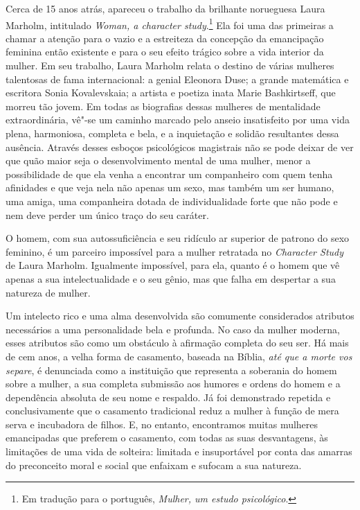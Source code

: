 Cerca de 15 anos atrás, apareceu o trabalho da brilhante norueguesa
Laura Marholm, intitulado \textit{Woman, a character study}.\footnote{Em tradução para o português, \textit{Mulher, um estudo psicológico}.} Ela foi uma das primeiras a
chamar a atenção para o vazio e a estreiteza da concepção da emancipação
feminina então existente e para o seu efeito trágico sobre a vida
interior da mulher. Em seu trabalho, Laura Marholm relata o destino de
várias mulheres talentosas de fama internacional: a genial Eleonora
Duse; a grande matemática e escritora Sonia Kovalevskaia; a artista e
poetiza inata Marie Bashkirtseff, que morreu tão jovem. Em todas as
biografias dessas mulheres de mentalidade extraordinária, vê"-se um
caminho marcado pelo anseio insatisfeito por uma vida plena, harmoniosa,
completa e bela, e a inquietação e solidão resultantes dessa ausência.
Através desses esboços psicológicos magistrais não se pode deixar de ver
que quão maior seja o desenvolvimento mental de uma mulher, menor a
possibilidade de que ela venha a encontrar um companheiro com quem tenha
afinidades e que veja nela não apenas um sexo, mas também um ser humano,
uma amiga, uma companheira dotada de individualidade forte que não pode
e nem deve perder um único traço do seu caráter.

O homem, com sua autossuficiência e seu ridículo ar superior de
patrono do sexo feminino, é um parceiro impossível para a mulher
retratada no \textit{Character Study} de Laura Marholm. Igualmente impossível, para ela, quanto é o homem que vê apenas a sua intelectualidade e o seu
gênio, mas que falha em despertar a sua natureza de mulher.

Um intelecto rico e uma alma desenvolvida são comumente considerados
atributos necessários a uma personalidade bela e profunda. No caso da
mulher moderna, esses atributos são como um obstáculo à afirmação
completa do seu ser. Há mais de cem anos, a velha forma de casamento,
baseada na Bíblia, \textit{até que a morte vos separe}, é denunciada
como a instituição que representa a soberania do homem sobre a mulher, a
sua completa submissão aos humores e ordens do homem e a dependência
absoluta de seu nome e respaldo. Já foi demonstrado repetida e
conclusivamente que o casamento tradicional reduz a mulher à função
de mera serva e incubadora de filhos. E, no entanto, encontramos muitas
mulheres emancipadas que preferem o casamento, com todas as suas
desvantagens, às limitações de uma vida de solteira: limitada e
insuportável por conta das amarras do preconceito moral e social que
enfaixam e sufocam a sua natureza.

